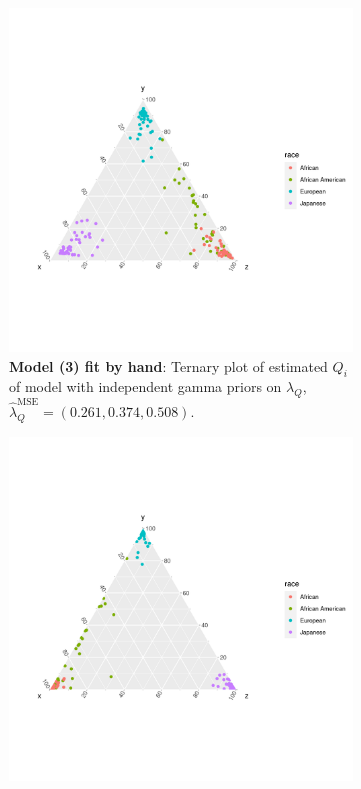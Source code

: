 \documentclass{article}
\begin{document}
\begin{figure}[h]
  \medskip

  \begin{subfigure}[t]{.4\textwidth}
    \centering
    \includegraphics[width=\linewidth]{SemesterProject/haplo_tern_mod3BH.png}
    \caption{\textbf{Model (3) fit by hand}: Ternary plot of estimated $Q_i$ of model with independent gamma priors on $\lambda_Q$, $\hat{\lambda}^{\text{MSE}}_Q = (0.261, 0.374, 0.508)$.}
  \end{subfigure}
  \hfill
  \begin{subfigure}[t]{.4\textwidth}
    \centering
    \includegraphics[width=\linewidth]{SemesterProject/haplo_tern_mod3NIMBLE.png}

\end{subfigure}
\end{figure}
\end{document}
